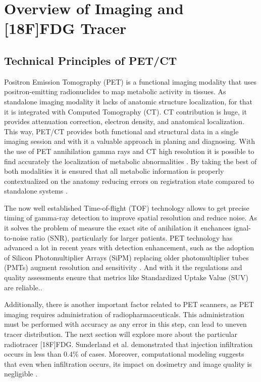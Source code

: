 \documentclass[11pt]{article} %
\begin{document}
\section{Overview of Imaging and [18F]FDG Tracer}

\subsection{Technical Principles of PET/CT}

Positron Emission Tomography (PET) is a functional imaging modality that uses positron-emitting radionuclides to map metabolic activity in tissues. As standalone imaging modality it lacks of anatomic structure localization, for that it is integrated with Computed Tomography (CT). CT contribution is huge, it provides attenuation correction, electron density, and anatomical localization. This way, PET/CT provides both functional and structural data in a single imaging session and with it a valuable approach in planing and diagnosing. With the use of PET annihilation gamma rays and CT high resolution it is possible to find accurately the localization of metabolic abnormalities \cite{TG174}. By taking the best of both modalities it is ensured that all metabolic information is properly contextualized on the anatomy reducing errors on registration state compared to standalone systems \cite{TG126}.



The now well established Time-of-flight (TOF) technology allows to get precise timing of gamma-ray detection to improve spatial resolution and reduce noise. As it solves the problem of measure the exact site of anihilation it enchances ignal-to-noise ratio (SNR), particularly for larger patients. \cite{Seifert2022} PET technology has advanced a lot in recent years with detection enhancement, such as the adoption of Silicon Photomultiplier Arrays (SiPM) replacing older photomultiplier tubes (PMTs) augment resolution and sensitivity \cite{SunderlandSeminar}. And with it the regulations and quality assessments ensure that metrics like Standardized Uptake Value (SUV) are reliable.\cite{TG174}.

Additionally, there is another important factor related to PET scanners, as PET imaging requires administration of radiopharmaceuticals. This administration must be performed with accuracy as any error in this step, can lead to uneven tracer distribution. The next section will explore more about the particular radiotracer [18F]FDG. Sunderland et al. demonstrated that injection infiltration occurs in less than 0.4\% of cases. Moreover, computational modeling suggests that even when infiltration occurs, its impact on dosimetry and image quality is negligible  \cite{Sunderland2023}. 
\end{document}

